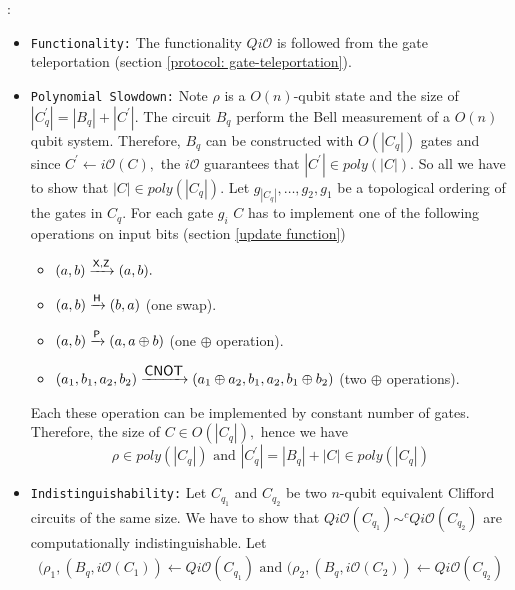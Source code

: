
:
\begin{itemize}
\item  {\tt Functionality:} The functionality $Qi\mathcal{O}$ is followed from the gate teleportation (section \ref{protocol: gate-teleportation}).
\item {\tt Polynomial Slowdown:} Note $\rho$ is a $O(n)$-qubit state and the size of $|C_q^\prime|=|B_q|+|C^\prime|.$ The circuit $B_q$ perform the Bell measurement of a $O(n)$ qubit system. Therefore, $B_q$ can be constructed with $O(|C_q|)$ gates and since $C^\prime\leftarrow i\mathcal{O}(C),$ the $i\mathcal{O}$ guarantees that $|C^\prime|\in poly(|C|).$ So all we have to show that $|C|\in poly(|C_q|).$  Let $g_{|C_q|},\dots, g_2,g_1$ be a topological ordering of the gates in $C_q.$ For each gate $g_i$ $C$ has to implement one of the following operations on input bits (section \ref{update function}) 
 \begin{itemize}
 \item[] $(a,b)\xrightarrow{{\sf X}, {\sf Z}}(a,b).$  
 \item[]  $(a,b)\xrightarrow{{\sf H}}(b,a)$         (one swap).
 \item[]  $(a,b)\xrightarrow{{\sf P}}(a,a\oplus b)$      (one $\oplus$ operation).
 \item[]  $(a_1,b_1,a_2,b_2)\xrightarrow{\mbox{{\sf CNOT}}}(a_1\oplus a_2,b_1,a_2, b_1\oplus b_2)$ (two $\oplus$ operations).
 \end{itemize}
 Each these operation can be implemented by constant number of gates. Therefore, the size of $C\in O(|C_q|),$ hence we have
\begin{equation*}
\rho\in poly(|C_q|)    \mbox{ and } |C_q^\prime |=|B_q|+|C| \in poly(|C_q|)
\end{equation*}

\item  {\tt Indistinguishability:} Let $C_{q_1}$ and $C_{q_2}$ be two $n$-qubit equivalent Clifford circuits of the same size. We have to show that $Qi\mathcal{O}(C_{q_1})\sim^c Qi\mathcal{O}(C_{q_2})$ are computationally indistinguishable. Let
\begin{equation*}
\begin{aligned}
(\rho_1 ,(B_q, i\mathcal{O}(C_1)) \leftarrow Qi\mathcal{O}(C_{q_1}) \mbox{ and }
(\rho_2 ,(B_q, i\mathcal{O}(C_2))\leftarrow Qi\mathcal{O}(C_{q_2})
 \end{aligned}
\end{equation*}



\end{itemize}
